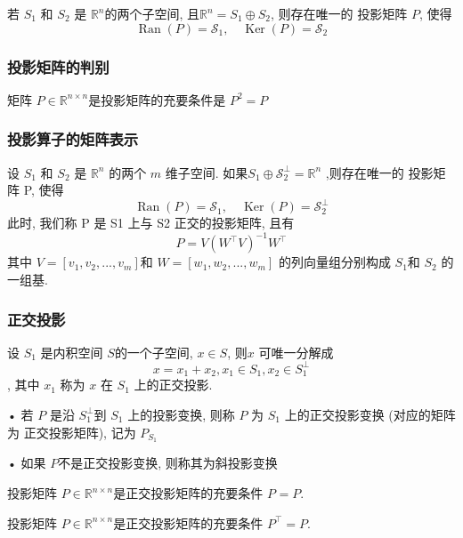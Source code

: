 \documentclass[12pt,a4paper]{article}
\begin{document}
\begin{lemma}
	若 $S_1$ 和 $S_2$ 是 $\mathbb{R}^n$的两个子空间, 且$ \mathbb{R}^n= S_1 ⊕ S_2$, 则存在唯一的
	投影矩阵 $P$, 使得
	$$
	\operatorname{Ran}(P)=\mathcal{S}_{1}, \quad \operatorname{Ker}(P)=\mathcal{S}_{2}
	$$
\end{lemma}


\subsubsection{投影矩阵的判别}

\begin{theorem}
	矩阵 $P ∈\mathbb{R}^{n×n}$是投影矩阵的充要条件是 $P^2=P$
\end{theorem}


\subsubsection{投影算子的矩阵表示}
设 $S_1$ 和 $S_2$ 是 $\mathbb{R}^n$ 的两个 $m$ 维子空间. 如果$S_{1} \oplus \mathcal{S}_{2}^{\perp}=\mathbb{R}^{n}$ ,则存在唯一的
投影矩阵 P, 使得
$$
\operatorname{Ran}(P)=\mathcal{S}_{1}, \quad \operatorname{Ker}(P)=\mathcal{S}_{2}^{\perp}
$$
此时, 我们称 P 是 S1 上与 S2 正交的投影矩阵, 且有
$$
P=V\left(W^{\top} V\right)^{-1} W^{\top}
$$
其中 $V = [v_1, v_2, . . . , v_m] $和 $W = [w_1, w_2, . . . , w_m]$ 的列向量组分别构成
$S_1 $和 $S_2$ 的一组基.

\subsubsection{正交投影}
设 $S_1$ 是内积空间 $S $的一个子空间, $x ∈ S$, 则$x$ 可唯一分解成
$$x = x_1 + x_2, x_1 ∈ S_1, x_2 ∈ S^{⊥}_1$$
,
其中 $x_1$ 称为 $x$ 在 $S_1$ 上的正交投影.

• 若 $P$ 是沿 $S^{⊥}_1 $到 $S_1$ 上的投影变换, 则称 $P$ 为 $S_1$ 上的正交投影变换
(对应的矩阵为 正交投影矩阵), 记为 $P_{S_1}$

• 如果 $P $不是正交投影变换, 则称其为斜投影变换


\begin{theorem}
	投影矩阵 $P ∈\mathbb{R}^{n×n}$是正交投影矩阵的充要条件 $P^{} = P$.
\end{theorem}



\begin{theorem}
	投影矩阵 $P ∈\mathbb{R}^{n×n}$是正交投影矩阵的充要条件 $P^{\top} = P$.
\end{theorem}
\end{document}
